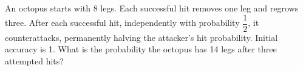 An octopus starts with 8 legs. Each successful hit removes one leg and regrows three. After each successful hit, independently with probability $\dfrac{1}{2}$, it counterattacks, permanently halving the attacker's hit probability. Initial accuracy is 1. What is the probability the octopus has 14 legs after three attempted hits?
